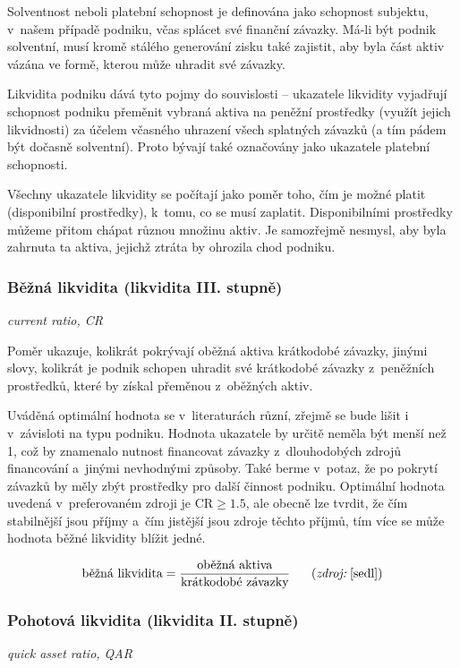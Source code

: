 Solventnost neboli platební schopnost je definována jako schopnost subjektu, v~našem případě podniku, včas splácet své finanční závazky. Má-li být podnik solventní, musí kromě stálého generování zisku také zajistit, aby byla část aktiv vázána ve formě, kterou může uhradit své závazky.

Likvidita podniku dává tyto pojmy do souvislosti -- ukazatele likvidity vyjadřují schopnost podniku přeměnit vybraná aktiva na peněžní prostředky (využít jejich likvidnosti) za účelem včasného uhrazení všech splatných závazků (a tím pádem být dočasně solventní).\cite{schol} Proto bývají také označovány jako ukazatele platební schopnosti.

Všechny ukazatele likvidity se počítají jako poměr toho, čím je možné platit (disponibilní prostředky), k~tomu, co se musí zaplatit. Disponibilními prostředky můžeme přitom chápat různou množinu aktiv. Je samozřejmě nesmysl, aby byla zahrnuta ta aktiva, jejichž ztráta by ohrozila chod podniku.

\subsubsection{Běžná likvidita (likvidita III. stupně)} 
\textit{current ratio, CR}

Poměr ukazuje, kolikrát pokrývají oběžná aktiva krátkodobé závazky, jinými slovy, kolikrát je podnik schopen uhradit své krátkodobé závazky z~peněžních prostředků, které by získal přeměnou z~oběžných aktiv.

Uváděná optimální hodnota se v~literaturách různí, zřejmě se bude lišit i v~závisloti na typu podniku. Hodnota ukazatele by určitě neměla být menší než 1, což by znamenalo nutnost financovat závazky z~dlouhodobých zdrojů financování a~jinými nevhodnými způsoby. Také berme v~potaz, že po pokrytí závazků by měly zbýt prostředky pro další činnost podniku.
Optimální hodnota uvedená v~preferovaném zdroji je CR$\geq 1.5$, ale obecně lze tvrdit, že čím stabilnější jsou příjmy a~čím jistější jsou zdroje těchto příjmů, tím více se může hodnota běžné likvidity blížit jedné.\cite{businessvize_bez_likv}

$$\vz{běžná likvidita}{oběžná aktiva}{krátkodobé závazky} \scite{sedl}$$

\subsubsection{Pohotová likvidita (likvidita II. stupně)} 
\textit{quick asset ratio, QAR}

